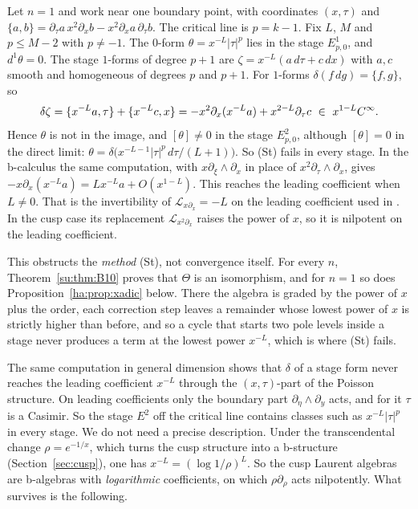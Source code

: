 \begin{example}[The stage obstruction, \(n=1\)]\label{ha:ex:obstruction}
Let \(n=1\) and work near one boundary point, with coordinates \((x,\tau)\)
and \(\{a,b\}=\partial_\tau a\,x^2\partial_xb-x^2\partial_xa\,
\partial_\tau b\). The critical line is \(p=k-1\). Fix \(L\), \(M\) and
\(p\le M-2\) with \(p\ne-1\). The \(0\)-form \(\theta=x^{-L}|\tau|^p\) lies
in the stage \(E^1_{p,0}\), and \(d^1\theta=0\). The stage \(1\)-forms of
degree \(p+1\) are \(\zeta=x^{-L}(a\,d\tau+c\,dx)\) with \(a,c\) smooth and
homogeneous of degrees \(p\) and \(p+1\). For \(1\)-forms
\(\delta(f\,dg)=\{f,g\}\), so
\[
 \delta\zeta=\{x^{-L}a,\tau\}+\{x^{-L}c,x\}=-x^2\partial_x(x^{-L}a)+
 x^{2-L}\partial_\tau c\ \in\ x^{1-L}C^\infty .
\]
Hence \(\theta\) is not in the image, and \([\theta]\ne0\) in the stage
\(E^2_{p,0}\), although \([\theta]=0\) in the direct limit:
\(\theta=\delta\bigl(x^{-L-1}|\tau|^p\,d\tau/(L+1)\bigr)\). So (St) fails in
every stage. In the b-calculus the same computation, with
\(x\partial_\xi\wedge\partial_x\) in place of \(x^2\partial_\tau\wedge
\partial_x\), gives \(-x\partial_x(x^{-L}a)=Lx^{-L}a+O(x^{1-L})\). This
reaches the leading coefficient when \(L\ne0\). That is the invertibility
of \(\mathcal L_{x\partial_x}=-L\) on the leading coefficient used in
\cite{HHb}. In the cusp case its replacement \(\mathcal L_{x^2\partial_x}\)
raises the power of \(x\), so it is nilpotent on the leading coefficient.

This obstructs the \emph{method} (St), not convergence itself. For
every \(n\), Theorem~\ref{su:thm:B10} proves that \(\Theta\) is an
isomorphism, and for \(n=1\) so does Proposition~\ref{ha:prop:xadic}
below. There the algebra is graded by the power of \(x\) plus the
order, each correction step leaves a remainder whose lowest power of
\(x\) is strictly higher than before, and so a cycle that starts two pole
levels inside a stage never produces a term at the lowest power
\(x^{-L}\), which is where (St) fails.
\end{example}

The same computation in general dimension shows that \(\delta\) of a stage
form never reaches the leading coefficient \(x^{-L}\) through the
\((x,\tau)\)-part of the Poisson structure. On leading coefficients only
the boundary part \(\partial_\eta\wedge\partial_y\) acts, and for it
\(\tau\) is a Casimir. So the stage \(E^2\) off the critical line contains
classes such as \(x^{-L}|\tau|^p\) in every stage. We do not need a
precise description. Under the transcendental change \(\rho=e^{-1/x}\), which
turns the cusp structure into a b-structure
(Section~\ref{sec:cusp}), one has \(x^{-L}=(\log1/\rho)^L\). So the cusp
Laurent algebras are b-algebras with \emph{logarithmic} coefficients, on
which \(\rho\partial_\rho\) acts nilpotently. What survives is the
following.

